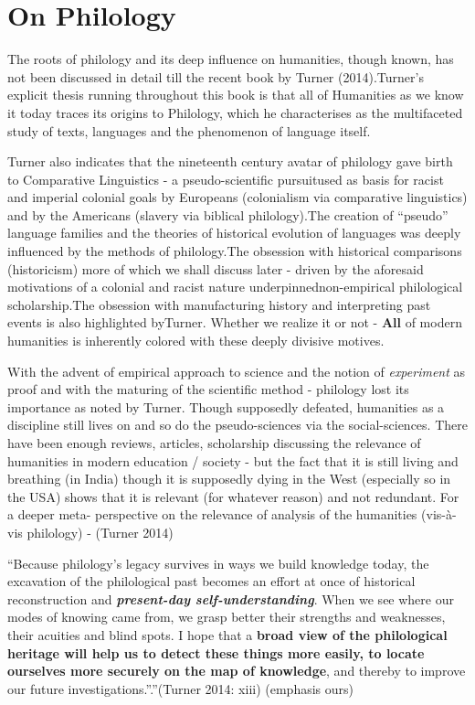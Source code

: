\section*{On Philology}

The roots of philology and its deep influence on humanities, though known, has not been discussed in detail till the recent book by Turner (2014).Turner’s explicit thesis running throughout this book is that all of Humanities as we know it today traces its origins to Philology, which he characterises as the multifaceted study of texts, languages and the phenomenon of language itself.

Turner also indicates that the nineteenth century avatar of philology gave birth to Comparative Linguistics - a pseudo-scientific pursuit\break used as basis for racist and imperial colonial goals by Europeans (colonialism via comparative linguistics) and by the Americans (slavery via biblical philology).The creation of “pseudo” language families and the theories of historical evolution of languages was deeply influenced by the methods of philology.The obsession with historical comparisons (historicism) more of which we shall discuss later - driven by the aforesaid motivations of a colonial and racist nature underpinned\break non-empirical philological scholarship.The obsession with manufacturing history and interpreting past events is also highlighted by\break Turner. Whether we realize it or not - \textbf{All} of modern humanities is inherently colored with these deeply divisive motives.

With the advent of empirical approach to science and the notion of \textit{experiment} as proof and with the maturing of the scientific method - philology lost its importance as noted by Turner. Though supposedly defeated, humanities as a discipline still lives on and so do the pseudo-sciences via the social-sciences. There have been enough reviews, articles, scholarship discussing the relevance of humanities in modern education / society - but the fact that it is still living and breathing (in India) though it is supposedly dying in the West (especially so in the USA) shows that it is relevant (for whatever reason) and not redundant. For a deeper meta- perspective on the relevance of analysis of the humanities (vis-à-vis philology) - (Turner 2014)

\begin{myquote}
“Because philology’s legacy survives in ways we build knowledge today, the excavation of the philological past becomes an effort at once of historical reconstruction and \textbf{\textit{present-day self-understanding}}. When we see where our modes of knowing came from, we grasp better their strengths and weaknesses, their acuities and blind spots. I hope that a \textbf{broad view of the philological heritage will help us to detect these things more easily, to locate ourselves more securely on the map of knowledge}, and thereby to improve our future investigations.”.”\hfill (Turner 2014: xiii) (emphasis ours)
\end{myquote}


